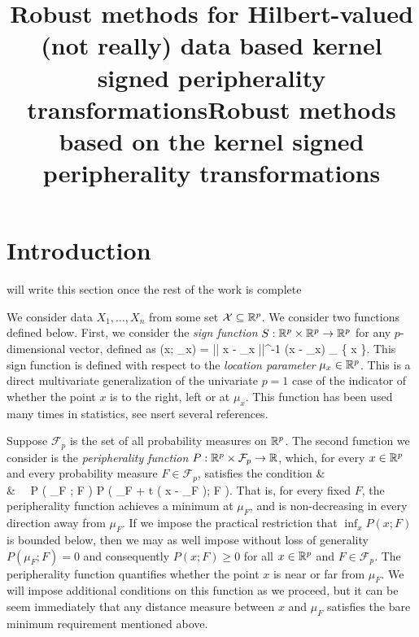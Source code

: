 \documentclass[12pt,letterpaper]{article}
\def\ban#1\ean{\begin{align*}#1\end{align*}}
\def\bredbf#1\eredbf{{\color{red}{\bf ???? #1 ????}}}
\theoremstyle{definition} \newtheorem{Definition}[Theorem]{Definition}
\begin{document}

\makeatletter
\def\@oddfoot{[\jobname (\today)]\hfil\thepage}
\makeatother

\title{Robust methods for Hilbert-valued (not really) data based kernel signed peripherality 
transformations}

\title{Robust methods  based on the kernel signed peripherality 
transformations}

\section{Introduction}

\bredbf
I will write this section once the rest of the work is complete
\eredbf

We consider data $X_{1}, \ldots, X_{n}$ from some set $\mathcal{X} \subseteq {\mathbb{R}}^{p}$. 
We consider two functions defined below. First, we consider the 
{\it sign function} $S : {\mathbb{R}}^{p} \times {\mathbb{R}}^{p} \rightarrow {\mathbb{R}}^{p}$ for any 
$p$-dimensional vector, defined as 
\ban
S (x; \mu_{x}) = || x - \mu_{x} ||^{-1} (x - \mu_{x}) _{ \{ x  \}}. 
\ean
This sign function is defined with respect to the {\it location parameter} 
$\mu_{x} \in {\mathbb{R}}^{p}$. This is a direct multivariate generalization of the 
univariate $ p = 1$ case of the indicator of whether the point $x$ is to the right, 
left or at $\mu_{x}$. This function has been used many times in statistics, see
\bredbf insert several references. \eredbf


Suppose $\mathcal{F}_{p}$ is the set of all probability 
measures on ${\mathbb{R}}^{p}$. The second function we consider is the {\it peripherality function} 
$ P : {\mathbb{R}}^{p} \times \mathcal{F}_{p} \rightarrow {\mathbb{R}}$, which, for every 
$x \in {\mathbb{R}}^{p}$ and every probability measure $F \in \mathcal{F}_{p}$, satisfies the 
condition
\ban 
&  
 \\
& \hspace{0.5cm}  \ \ 
P \Bigl( \mu_{F} ; F \Bigr) \leq P \Bigl( \mu_{F} + t ( x - \mu_{F} ); F \Bigr). 
\ean 
That is, for every fixed $F$, the peripherality function achieves a minimum at 
$\mu_{F}$, and is non-decreasing in every direction away from $\mu_{F}$. If 
we impose the practical restriction that $\inf_{x} P ( x ; F )$ is bounded below, 
then we may as well impose without loss of generality $P ( \mu_{F} ; F ) = 0$
and consequently $P ( x ; F ) \geq 0$ for all $x \in {\mathbb{R}}^{p}$ and 
$F \in \mathcal{F}_{p}$. The peripherality function quantifies whether the point $x$ 
is near or far from $\mu_{F}$. We will impose additional conditions on this function 
as we proceed, but it can be seem immediately that any distance measure between 
$x$ and $\mu_{F}$ satisfies the bare minimum requirement mentioned above. 
\end{document}
